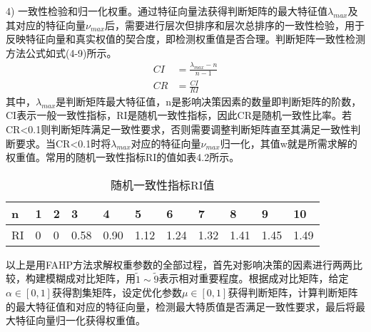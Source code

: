 4) 一致性检验和归一化权重。通过特征向量法获得判断矩阵的最大特征值$\lambda_{max}$及其对应的特征向量$\nu_{max}$后，需要进行层次但排序和层次总排序的一致性检验，用于反映特征向量和真实权值的契合度，即检测权重值是否合理。判断矩阵一致性检测方法公式如式(4-9)所示。
\begin{equation}
\begin{split}
CI &= \frac{\lambda_{max}-n}{n-1} \\
CR &= \frac{CI}{RI}
\end{split}
\end{equation}
其中，$\lambda_{max}$是判断矩阵最大特征值，n是影响决策因素的数量即判断矩阵的阶数，CI表示一般一致性指标，RI是随机一致性指标，因此CR是随机一致性比率。若CR<0.1则判断矩阵满足一致性要求，否则需要调整判断矩阵直至其满足一致性判断要求。当CR<0.1时将$\lambda_{max}$对应的特征向量$\nu_{max}$归一化，其值w就是所需求解的权重值。常用的随机一致性指标RI的值如表4.2所示。
\begin{table}[htbp]
	\centering\dawu[1.3]
	\caption{随机一致性指标RI值}
	\begin{tabular}{|p{0.8cm}<{\centering}|p{0.8cm}<{\centering}|p{0.8cm}<{\centering}|p{0.8cm}<{\centering}|p{0.8cm}<{\centering}|p{0.8cm}<{\centering}|p{0.8cm}<{\centering}|p{0.8cm}<{\centering}|p{0.8cm}<{\centering}|p{0.8cm}<{\centering}|p{0.8cm}<{\centering}|} \hline
	n & 1 & 2 & 3 & 4 & 5 & 6 & 7 & 8 & 9 & 10 \\ \hline
	RI & 0 & 0 & 0.58 & 0.90 & 1.12 & 1.24 & 1.32 & 1.41 & 1.45 & 1.49 \\ \hline
	\end{tabular}
\end{table}

以上是用FAHP方法求解权重参数的全部过程，首先对影响决策的因素进行两两比较，构建模糊成对比矩阵，用$\widetilde{1}\sim \widetilde{9}$表示相对重要程度。根据成对比矩阵，给定$\alpha\in[0,1]$获得割集矩阵，设定优化参数$\mu \in[0,1]$获得判断矩阵，计算判断矩阵的最大特征值和对应的特征向量，检测最大特质值是否满足一致性要求，最后将最大特征向量归一化获得权重值。


